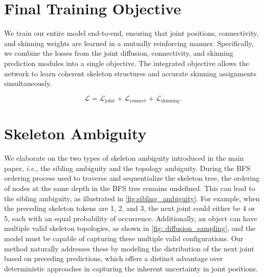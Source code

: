 \section{Final Training Objective}

We train our entire model end-to-end, ensuring that joint positions, connectivity, and skinning weights are learned in a mutually reinforcing manner. Specifically, we combine the losses from the joint diffusion, connectivity, and skinning prediction modules into a single objective. The integrated objective allows the network to learn coherent skeleton structures and accurate skinning assignments simultaneously.

\begin{equation*}
    \mathcal{L} = \mathcal{L}_{\text{joint}} + \mathcal{L}_{\text{connect}} + \mathcal{L}_{\text{skinning}}.
\end{equation*}


\section{Skeleton Ambiguity}

We elaborate on the two types of skeleton ambiguity introduced in the main paper, \textit{i.e.}, the sibling ambiguity and the topology ambiguity. During the BFS ordering process used to traverse and sequentialize the skeleton tree, the ordering of nodes at the same depth in the BFS tree remains undefined. This can lead to the sibling ambiguity, as illustrated in \cref{fig:sibling_ambiguity}. For example, when the preceding skeleton tokens are 1, 2, and 3, the next joint could either be 4 or 5, each with an equal probability of occurrence.
Additionally, an object can have multiple valid skeleton topologies, as shown in \cref{fig: diffusion_sampling}, and the model must be capable of capturing these multiple valid configurations.
Our method naturally addresses these by modeling the distribution of the next joint based on preceding predictions, which offers a distinct advantage over deterministic approaches in capturing the inherent uncertainty in joint positions.




